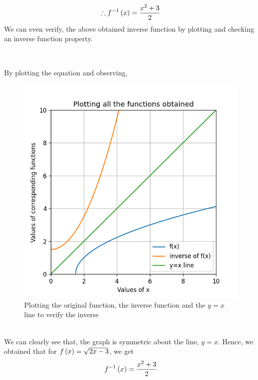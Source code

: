 \documentclass[journal,12pt,twocolumn]{IEEEtran}
\begin{document}
\begin{itemize}
	\begin{align}
	\therefore f^{-1}\left(x\right) = \frac{x^{2} + 3}{2}
	\end{align}
	We can even verify, the above obtained inverse function by plotting and checking an inverse function property.
	\begin{center}
\\
\end{center}
	By plotting the equation and observing,
	\begin{figure}[h!]
		\centering
		\includegraphics[width=\columnwidth]{Fig_2.png}
		\caption{Plotting the original function, the inverse function and the $y=x$ line to verify the inverse}
	\end{figure}\\
	We can clearly see that, the graph is symmetric about the line, $y = x$. Hence, we obtained that for $f\left(x\right)=\sqrt{2x-3}$, we get
	\begin{align} \label{eq:1.1}
	f^{-1}\left(x\right) = \frac{x^{2} + 3}{2}
	\end{align}

\end{itemize}
\end{document}
